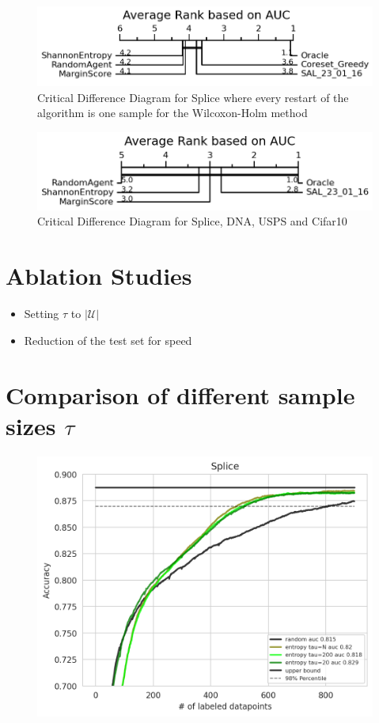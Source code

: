 \documentclass[]{article}
\begin{document}
\begin{figure}[H]
\centering
\includegraphics[width=0.8\linewidth]{img/eval_splice_embedded_cd}
\caption{Critical Difference Diagram for Splice where every restart of the algorithm is one sample for the Wilcoxon-Holm method}
\end{figure}
\begin{figure}[H]
\centering
\includegraphics[width=0.8\linewidth]{img/eval_macro}
\caption{Critical Difference Diagram for Splice, DNA, USPS and Cifar10}
\end{figure}



\section{Ablation Studies}
\begin{itemize}
	\item Setting $\tau$ to $|\mathcal{U}|$
	\item Reduction of the test set for speed
\end{itemize}



 

\appendix

\section{Comparison of different sample sizes $\tau$}
\begin{figure}[H]
	\centering
	\includegraphics[width=0.7\linewidth]{img/tau_ablation.png}
\end{figure}
\end{document}
